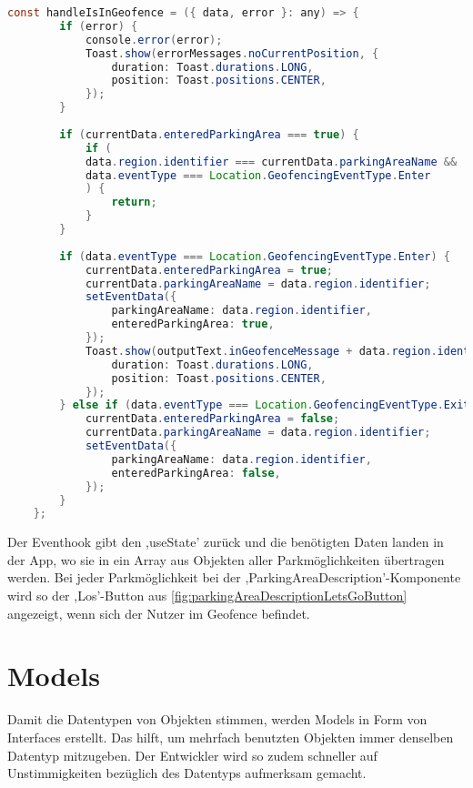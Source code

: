 \begin{lstlisting}[caption={Diese Funktion wird beim Betreten oder Verlassen eines Geofences ausgeführt. Im Fehlerfall bekommt der Nutzer per Toast mit, dass etwas schief gelaufen ist. Von Zeile 10 bis 17 wird sichergestellt, dass dasselbe Event nicht fälschlicherweise mehrmals hintereinander auftritt. Anschließend werden die Werte, ob das Geofence verlassen oder betreten wird, gesetzt. Beim Eintritt in das Geofence wird der Nutzer mittels Toast informiert. (Quelle: Eigene Implementierung)},captionpos=b, language=Java, label=lst:handleIsInGeofence]
	const handleIsInGeofence = ({ data, error }: any) => {
		if (error) {
			console.error(error);
			Toast.show(errorMessages.noCurrentPosition, {
				duration: Toast.durations.LONG,
				position: Toast.positions.CENTER,
			});
		}
		
		if (currentData.enteredParkingArea === true) {
			if (
			data.region.identifier === currentData.parkingAreaName &&
			data.eventType === Location.GeofencingEventType.Enter
			) {
				return;
			}
		}
		
		if (data.eventType === Location.GeofencingEventType.Enter) {
			currentData.enteredParkingArea = true;
			currentData.parkingAreaName = data.region.identifier;
			setEventData({
				parkingAreaName: data.region.identifier,
				enteredParkingArea: true,
			});
			Toast.show(outputText.inGeofenceMessage + data.region.identifier, {
				duration: Toast.durations.LONG,
				position: Toast.positions.CENTER,
			});
		} else if (data.eventType === Location.GeofencingEventType.Exit) {
			currentData.enteredParkingArea = false;
			currentData.parkingAreaName = data.region.identifier;
			setEventData({
				parkingAreaName: data.region.identifier,
				enteredParkingArea: false,
			});
		}
	};
\end{lstlisting}

Der Eventhook gibt den ,useState' zurück und die benötigten Daten landen in der App, wo sie in ein Array aus Objekten aller Parkmöglichkeiten übertragen werden. Bei jeder Parkmöglichkeit bei der ,ParkingAreaDescription'-Komponente wird so der ,Los'-Button aus \autoref{fig:parkingAreaDescriptionLetsGoButton} angezeigt, wenn sich der Nutzer im Geofence befindet.

\section{Models}
Damit die Datentypen von Objekten stimmen, werden Models in Form von Interfaces erstellt. Das hilft, um mehrfach benutzten Objekten immer denselben Datentyp mitzugeben. Der Entwickler wird so zudem schneller auf Unstimmigkeiten bezüglich des Datentyps aufmerksam gemacht.

